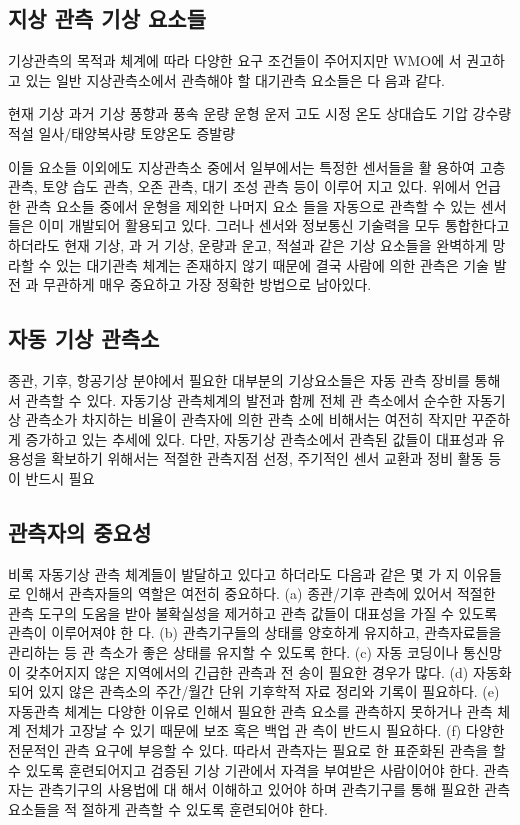 \subsection{지상 관측 기상 요소들}

기상관측의 목적과 체계에 따라 다양한 요구 조건들이 주어지지만 WMO에
서 권고하고 있는 일반 지상관측소에서 관측해야 할 대기관측 요소들은 다
음과 같다.

현재 기상
과거 기상
풍향과 풍속
운량
운형
운저 고도
시정
온도
상대습도
기압
강수량
적설
일사/태양복사량
토양온도
증발량

이들 요소들 이외에도 지상관측소 중에서 일부에서는 특정한 센서들을 활
용하여 고층 관측, 토양 습도 관측, 오존 관측, 대기 조성 관측 등이 이루어
지고 있다. 위에서 언급한 관측 요소들 중에서 운형을 제외한 나머지 요소
들을 자동으로 관측할 수 있는 센서들은 이미 개발되어 활용되고 있다.
그러나 센서와 정보통신 기술력을 모두 통합한다고 하더라도 현재 기상, 과
거 기상, 운량과 운고, 적설과 같은 기상 요소들을 완벽하게 망라할 수 있는
대기관측 체계는 존재하지 않기 때문에 결국 사람에 의한 관측은 기술 발전
과 무관하게 매우 중요하고 가장 정확한 방법으로 남아있다.

\subsection{자동 기상 관측소}

종관, 기후, 항공기상 분야에서 필요한 대부분의 기상요소들은 자동 관측
장비를 통해서 관측할 수 있다. 자동기상 관측체계의 발전과 함께 전체 관
측소에서 순수한 자동기상 관측소가 차지하는 비율이 관측자에 의한 관측
소에 비해서는 여전히 작지만 꾸준하게 증가하고 있는 추세에 있다. 다만,
자동기상 관측소에서 관측된 값들이 대표성과 유용성을 확보하기 위해서는
적절한 관측지점 선정, 주기적인 센서 교환과 정비 활동 등이 반드시 필요

\subsection{관측자의 중요성}
비록 자동기상 관측 체계들이 발달하고 있다고 하더라도 다음과 같은 몇 가
지 이유들로 인해서 관측자들의 역할은 여전히 중요하다.
(a) 종관/기후 관측에 있어서 적절한 관측 도구의 도움을 받아 불확실성을
제거하고 관측 값들이 대표성을 가질 수 있도록 관측이 이루어져야 한
다.
(b) 관측기구들의 상태를 양호하게 유지하고, 관측자료들을 관리하는 등 관
측소가 좋은 상태를 유지할 수 있도록 한다.
(c) 자동 코딩이나 통신망이 갖추어지지 않은 지역에서의 긴급한 관측과 전
송이 필요한 경우가 많다.
(d) 자동화되어 있지 않은 관측소의 주간/월간 단위 기후학적 자료 정리와
기록이 필요하다.
(e) 자동관측 체계는 다양한 이유로 인해서 필요한 관측 요소를 관측하지
못하거나 관측 체계 전체가 고장날 수 있기 때문에 보조 혹은 백업 관
측이 반드시 필요하다.
(f) 다양한 전문적인 관측 요구에 부응할 수 있다. 따라서 관측자는 필요로
한 표준화된 관측을 할 수 있도록 훈련되어지고 검증된 기상 기관에서
자격을 부여받은 사람이어야 한다. 관측자는 관측기구의 사용법에 대
해서 이해하고 있어야 하며 관측기구를 통해 필요한 관측 요소들을 적
절하게 관측할 수 있도록 훈련되어야 한다.

